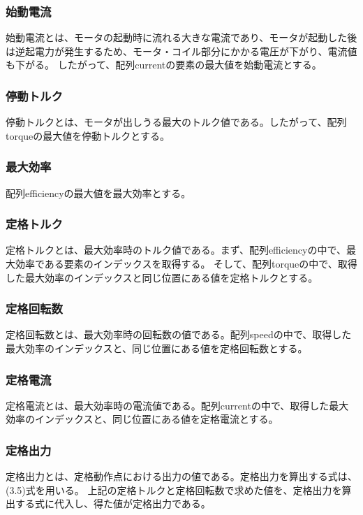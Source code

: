 \subsubsection{始動電流}\label{sub:sub:sidouden}
始動電流とは、モータの起動時に流れる大きな電流であり、モータが起動した後は逆起電力が発生するため、モータ・コイル部分にかかる電圧が下がり、電流値も下がる。
したがって、配列currentの要素の最大値を始動電流とする。

\subsubsection{停動トルク}\label{sub:sub:teidoutoruku}
停動トルクとは、モータが出しうる最大のトルク値である。したがって、配列torqueの最大値を停動トルクとする。

\subsubsection{最大効率}\label{sub:sub:saidaikouritu}
配列efficiencyの最大値を最大効率とする。

\subsubsection{定格トルク}\label{sub:sub:teikakutoruku}
定格トルクとは、最大効率時のトルク値である。まず、配列efficiencyの中で、最大効率である要素のインデックスを取得する。
そして、配列torqueの中で、取得した最大効率のインデックスと同じ位置にある値を定格トルクとする。

\subsubsection{定格回転数}\label{sub:sub:teikakukaiten}
定格回転数とは、最大効率時の回転数の値である。配列speedの中で、取得した最大効率のインデックスと、同じ位置にある値を定格回転数とする。

\subsubsection{定格電流}\label{sub:sub:teikakuden}
定格電流とは、最大効率時の電流値である。配列currentの中で、取得した最大効率のインデックスと、同じ位置にある値を定格電流とする。

\subsubsection{定格出力}\label{sub:sub:teikakusyutu}
定格出力とは、定格動作点における出力の値である。定格出力を算出する式は、%
(3.5)式を用いる。
上記の定格トルクと定格回転数で求めた値を、定格出力を算出する式に代入し、得た値が定格出力である。

